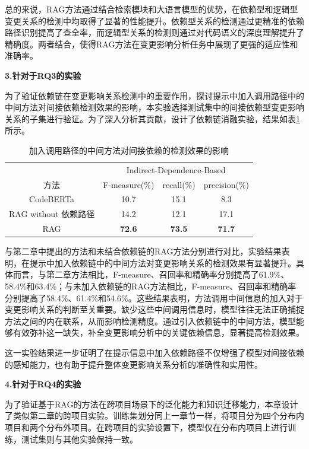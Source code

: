 总的来说，RAG方法通过结合检索模块和大语言模型的优势，在依赖型和逻辑型变更关系的检测中均取得了显著的性能提升。依赖型关系的检测通过更精准的依赖路径识别提高了查全率，而逻辑型关系的检测则通过对代码语义的深度理解提升了精确度。两者结合，使得RAG方法在变更影响分析任务中展现了更强的适应性和准确率。

\textbf{3.针对于RQ3的实验}

为了验证依赖链在变更影响关系检测中的重要作用，探讨提示中加入调用路径中的中间方法对间接依赖检测效果的影响，本实验选择测试集中的间接依赖型变更影响关系的子集进行验证。为了深入分析其贡献，设计了依赖链消融实验，结果如表\ref{2_消融实验}所示。

\begin{table}[htbp]
\caption{加入调用路径的中间方法对间接依赖的检测效果的影响}
\label{2_消融实验}
\vspace{0.5em}\centering\wuhao
\begin{tabular}{cccc }
\toprule
  & \multicolumn{3}{c}{Indirect-Dependence-Based}  \\
方法 & F-measure(\%) & recall(\%) & precision(\%) \\  
\midrule
CodeBERTa  &  10.7 & 15.1 & 8.3 \\
\midrule
RAG without 依赖路径  & 14.2 & 12.1 & 17.1 \\
RAG  & \textbf{72.6} & \textbf{73.5} & \textbf{71.7} \\
\bottomrule
\end{tabular}
\end{table}

与第二章中提出的方法和未结合依赖链的RAG方法分别进行对比，实验结果表明，在提示中加入依赖链中的中间方法对变更影响关系的检测效果有显著提升。具体而言，与第二章方法相比，F-measure、召回率和精确率分别提高了61.9\%、58.4\%和63.4\%；与未加入依赖链的RAG方法相比，F-measure、召回率和精确率分别提高了58.4\%、61.4\%和54.6\%。这些结果表明，方法调用中间信息的加入对于变更影响关系的判断至关重要。缺少这些中间调用信息时，模型往往无法正确捕捉方法之间的内在联系，从而影响检测精度。通过引入依赖链中的中间方法，模型能够有效弥补这一缺失，补全变更影响分析中的关键依赖信息，显著提高检测效果。

这一实验结果进一步证明了在提示信息中加入依赖路径不仅增强了模型对间接依赖的感知能力，也有助于提升整体变更影响关系分析的准确性和实用性。

\textbf{4.针对于RQ4的实验}

为了验证基于RAG的方法在跨项目场景下的泛化能力和知识迁移能力，本章设计了类似第二章的跨项目实验。训练集划分同上一章节一样，将项目分为四个分布内项目和两个分布外项目。在跨项目的实验设置下，模型仅在分布内项目上进行训练，测试集则与其他实验保持一致。

